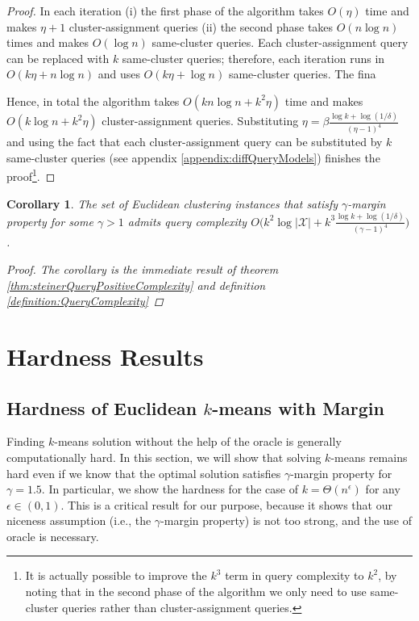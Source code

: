 \documentclass{article}
\newcommand{\mc}{\mathcal}
\newtheorem{corollary}[theorem]{Corollary}
\begin{document}
\begin{proof}
In each iteration (i) the first phase of the algorithm takes $O(\eta)$ time and makes $\eta+1$ cluster-assignment queries (ii) the second phase takes $O(n\log n)$ times and makes $O(\log n)$ same-cluster queries. Each cluster-assignment query can be replaced with $k$ same-cluster queries; therefore, each iteration runs in $O(k\eta + n\log n)$ and uses $O(k\eta + \log n)$ same-cluster queries. The fina

Hence, in total the algorithm takes $O(kn\log n + k^2\eta)$ time and makes $O(k\log n + k^2\eta)$ cluster-assignment queries. Substituting $\eta = \beta\frac{\log k + \log(1/\delta)}{(\eta-1)^4}$ and using the fact that each cluster-assignment query can be substituted by $k$ same-cluster queries (see appendix \ref{appendix:diffQueryModels}) finishes the proof\footnote{It is actually possible to improve the $k^3$ term in query complexity to $k^2$, by noting that in the second phase of the algorithm we only need to use same-cluster queries rather than cluster-assignment queries.}.
\end{proof}

\begin{corollary}
The set of Euclidean clustering instances that satisfy $\gamma$-margin property for some $\gamma > 1$ admits query complexity $O\big(k^2\log |\mc X| + k^3\frac{\log k + \log (1/\delta)}{(\gamma - 1)^4}\big)$. 
\begin{proof}
The corollary is the immediate result of theorem \ref{thm:steinerQueryPositiveComplexity} and definition \ref{definition:QueryComplexity}
\end{proof}

\end{corollary}

\section{Hardness Results}
\label{section:lowerBounds}

\subsection{Hardness of Euclidean $k$-means with Margin}

Finding $k$-means solution without the help of the oracle is generally computationally hard. In this section, we will show that solving $k$-means remains hard even if we know that the optimal solution satisfies $\gamma$-margin property for $\gamma=1.5$. In particular, we show the hardness for the case of $k=\Theta(n^\epsilon)$ for any $\epsilon\in (0,1)$. This is a critical result for our purpose, because it shows that our niceness assumption (i.e., the $\gamma$-margin property) is not too strong, and the use of oracle is necessary.
\end{document}
